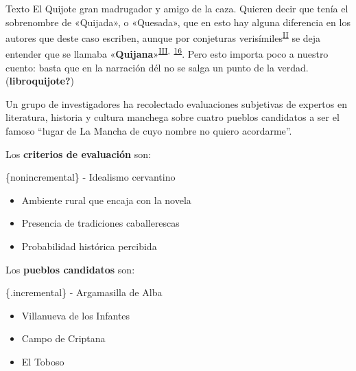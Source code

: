 \documentclass[
  ignorenonframetext,
]{beamer}
\begin{document}
\begin{frame}{Texto El Quijote}
{gran madrugador y amigo de la caza. Quieren decir que tenía el
sobrenombre de «Quijada», o «Quesada», que en esto hay alguna diferencia
en los autores que deste caso escriben, aunque por conjeturas
verisímiles\textsuperscript{\href{https://cvc.cervantes.es/literatura/clasicos/quijote/edicion/parte1/cap01/default.htm\#acn2}{II}}
se deja entender que se llamaba
«\textbf{Quijana}»\textsuperscript{\href{https://cvc.cervantes.es/literatura/clasicos/quijote/edicion/parte1/cap01/default.htm\#acn3}{III},~\href{https://cvc.cervantes.es/literatura/clasicos/quijote/edicion/parte1/cap01/default.htm\#np16n}{16}}.
Pero esto importa poco a nuestro cuento: basta que en la narración dél
no se salga un punto de la verdad. (\textbf{libroquijote?})}
\end{frame}

\begin{frame}
Un grupo de investigadores ha recolectado evaluaciones subjetivas de
expertos en literatura, historia y cultura manchega sobre cuatro pueblos
candidatos a ser el famoso ``lugar de La Mancha de cuyo nombre no quiero
acordarme''.

Los \textbf{criterios de evaluación} son:

\{nonincremental\} - Idealismo cervantino

\begin{itemize}
\item
  Ambiente rural que encaja con la novela
\item
  Presencia de tradiciones caballerescas
\item
  Probabilidad histórica percibida
\end{itemize}
\end{frame}

\begin{frame}
Los \textbf{pueblos candidatos} son:

\{.incremental\} - Argamasilla de Alba

\begin{itemize}
\item
  Villanueva de los Infantes
\item
  Campo de Criptana
\item
  El Toboso
\end{itemize}
\end{frame}
\end{document}
